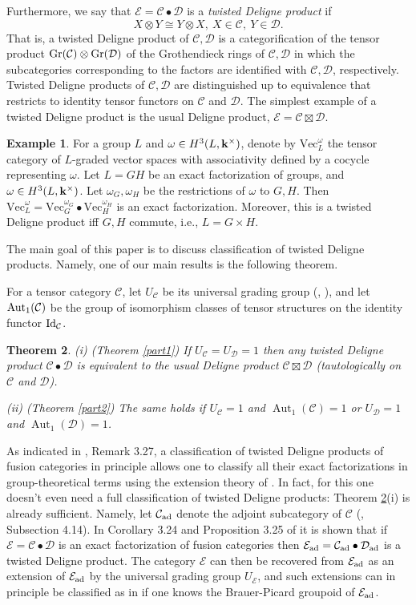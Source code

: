 \documentclass[12pt]{amsart}
\numberwithin{equation}{section}
\newtheorem{theorem}{Theorem}[section]
\theoremstyle{definition}
\newtheorem{example}[theorem]{Example}
\newcommand{\Aut}{\text{Aut}}
\newcommand{\1}{_{(1)}}
\newcommand{\2}{_{(2)}}
\newcommand{\3}{_{(3)}}
\newcommand{\4}{_{(4)}}
\newcommand{\5}{_{(5)}}
\newcommand{\6}{_{(6)}}
\newcommand{\C}{\mathcal{C}}
\theoremstyle{plain}
\theoremstyle{definition}
\theoremstyle{remark}
\def\C{\mathcal{C}}
\def\D{\mathcal{D}}
\def\E{\mathcal{E}}
\def\Aut{\mathop{\mathrm{Aut}}\nolimits}
\def\Vec{\mathrm{Vec}}
\begin{document}
Furthermore, we say that $\E=\C\bullet \D$ is a {\it twisted Deligne product} if 
$$
X\otimes Y\cong Y\otimes X,\ X\in \C,\ Y\in \D.
$$
That is, a twisted Deligne product of $\C,\D$ is a categorification of the tensor product ${\rm Gr}(\C)\otimes {\rm Gr}(\D)$ of the Grothendieck rings of $\C,\D$ in which the subcategories 
corresponding to the factors are identified with $\C,\D$, respectively. Twisted Deligne products of $\C,\D$ 
are distinguished up to equivalence that restricts to identity tensor functors on $\C$ and $\D$. The simplest example of a twisted Deligne product is the usual Deligne product, $\E=\C\boxtimes \D$. 

\begin{example}\label{groupprod} For a group $L$ and $\omega\in H^3(L,\bold k^\times)$, denote by $\Vec_L^\omega$ 
the tensor category of $L$-graded vector spaces with associativity defined by a cocycle representing $\omega$. Let $L=GH$ be an exact factorization of groups, and $\omega\in H^3(L,\bold k^\times)$. 
Let $\omega_G,\omega_H$ be the restrictions of $\omega$ to $G,H$. Then $\Vec_L^\omega=\Vec_G^{\omega_G}\bullet \Vec_H^{\omega_H}$ is an exact factorization. Moreover, this is a twisted Deligne product iff $G,H$ commute, i.e., $L=G\times H$.
\end{example} 
 
The main goal of this paper is to discuss classification of twisted Deligne products. Namely, one of our main results 
is the following theorem. 

For a tensor category $\mathcal C$, let $U_{\mathcal C}$ be its universal grading group 
(\cite[3.2]{GN}, \cite[Subsection 4.14]{EGNO}), and let ${\rm Aut}_1(\C)$ be the group of isomorphism classes of tensor structures on the identity functor ${\rm Id}_\C$.

 \begin{theorem} \label{maint} (i) (Theorem \ref{part1}) If $U_\C= U_\D=1$ then 
 any twisted Deligne product $\C\bullet \D$ is equivalent to the usual Deligne product $\C\boxtimes \D$ 
 (tautologically on $\C$ and $\D$). 
 
 (ii) (Theorem \ref{part2}) 
 The same holds if $U_\C=1$ and $\Aut_1(\C)=1$ or $U_\D=1$ and $\Aut_1(\D)=1$.
 \end{theorem} 
 
 As indicated in \cite{MPP}, Remark 3.27, a classification of twisted Deligne products of fusion categories in principle allows one to classify all their exact factorizations in group-theoretical terms using the extension theory of \cite{ENO}. In fact, for this one doesn't even need a full classification of twisted Deligne products: Theorem \ref{maint}(i) is already sufficient. Namely, let $\C_{\rm ad}$ denote the adjoint subcategory of $\C$ (\cite{EGNO}, Subsection 4.14). In Corollary 3.24 and Proposition 3.25 of \cite{MPP} it is shown that 
if $\E=\C\bullet \D$ is an exact factorization of fusion categories then $\E_{\rm ad}=\C_{\rm ad}\bullet \D_{\rm ad}$ is a twisted Deligne product. The category $\E$ can then be recovered from $\E_{\rm ad}$ as an extension of $\E_{\rm ad}$ by the universal grading group $U_\mathcal E$, and such extensions can in principle be classified as in \cite{ENO} if one knows the Brauer-Picard groupoid of $\E_{\rm ad}$. 
\end{document}
